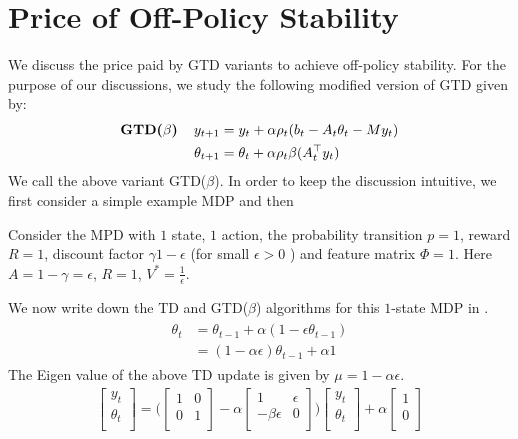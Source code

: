 \section{Price of Off-Policy Stability}
We discuss the price paid by GTD variants to achieve off-policy stability.
For the purpose of our discussions, we study the following modified version of GTD given by:
\begin{align}\label{gtdbeta}
\begin{split}
\textbf{GTD($\beta$)\quad}y_{t+1}&=y_t+\alpha \rho_t(b_t-A_t\theta_t - M y_t)\\
\theta_{t+1}&=\theta_t+\alpha\rho_t\beta(A^\top_ty_t)
\end{split}
\end{align}
We call the above variant GTD($\beta$).
In order to keep the discussion intuitive, we first consider a simple example MDP and then
\begin{example}\label{onestatemdp}
Consider the MPD with $1$ state, $1$ action, the probability transition $p=1$, reward $R=1$, discount factor $\gamma 1-\epsilon$ (for small $\epsilon>0$ ) and feature matrix $\Phi=1$. Here $A=1-\gamma=\epsilon$, $R=1$, $V^*=\frac{1}{\epsilon}$.
\end{example}
We now write down the TD and GTD($\beta$) algorithms for this $1$-state MDP in .
\begin{align}\label{tdonestate}
\begin{split}
\theta_{t}&=\theta_{t-1}+\alpha(1-\epsilon\theta_{t-1})\\
&=(1-\alpha\epsilon)\theta_{t-1}+\alpha 1
\end{split}
\end{align}
The Eigen value of the above TD update is given by $\mu=1-\alpha\epsilon$.
\begin{align}\label{gtdbeta}
\begin{bmatrix} y_t \\ \theta_t\\\end{bmatrix}=\Big(\begin{bmatrix} 1&0 \\ 0& 1\\\end{bmatrix} - \alpha\begin{bmatrix} 1&\epsilon \\ -\beta\epsilon& 0\\\end{bmatrix}\Big)\begin{bmatrix} y_t \\ \theta_t\\\end{bmatrix}+\alpha\begin{bmatrix} 1 \\ 0\\\end{bmatrix}
\end{align}
